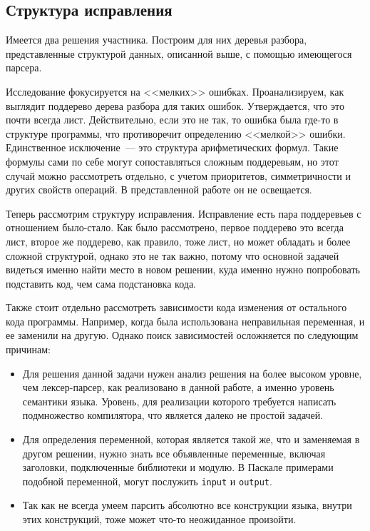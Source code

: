 \subsection{Структура исправления}

Имеется два решения участника. Построим для них деревья разбора, представленные структурой данных, описанной выше, 
с помощью имеющегося парсера. 

Исследование фокусируется на <<мелких>> ошибках. Проанализируем, как выглядит поддерево дерева разбора для таких ошибок.
Утверждается, что это почти всегда лист. Действительно, если это не так, то ошибка была где-то в структуре программы,
что противоречит определению <<мелкой>> ошибки. Единственное исключение~--- это структура арифметических формул. Такие
формулы сами по себе могут сопоставляться сложным поддеревьям, но этот случай можно рассмотреть отдельно, с учетом
приоритетов, симметричности и других свойств операций. В представленной работе он не освещается.

Теперь рассмотрим структуру исправления. Исправление есть пара поддеревьев с отношением было-стало. Как было рассмотрено,
первое поддерево это всегда лист, второе же поддерево, как правило, тоже лист, но может обладать и более сложной структурой,
однако это не так важно, потому что основной задачей видеться именно найти место в новом решении, куда именно нужно попробовать 
подставить код, чем сама подстановка кода.   

Также стоит отдельно рассмотреть зависимости кода изменения от остального кода программы.
Например, когда была использована неправильная переменная, и ее заменили на другую. Однако поиск зависимостей 
осложняется по следующим причинам:
\begin{itemize}
    \item Для решения данной задачи нужен анализ решения на более высоком уровне, чем лексер-парсер, как реализовано
        в данной работе, а именно уровень семантики языка. Уровень, для реализации которого требуется написать
        подмножество компилятора, что является далеко не простой задачей.
    \item Для определения переменной, которая является такой же, что и заменяемая в другом решении, нужно знать
        все объявленные переменные, включая заголовки, подключенные библиотеки и модулю. В Паскале примерами подобной переменной,
        могут послужить \texttt{input} и \texttt{output}.
    \item Так как не всегда умеем парсить абсолютно все конструкции языка, внутри этих конструкций, тоже может что-то 
        неожиданное произойти.
\end{itemize}

